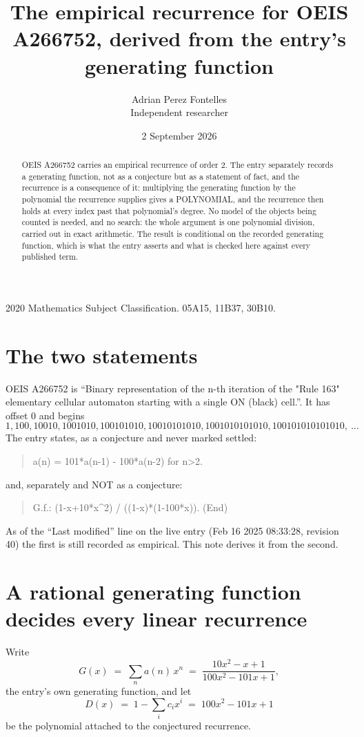 \documentclass[11pt,a4paper]{article}
\title{The empirical recurrence for OEIS A266752, derived from the entry's generating function}
\author{Adrian Perez Fontelles\\ \small Independent researcher}
\date{2 September 2026}
\theoremstyle{plain}
\theoremstyle{definition}
\begin{document}
\maketitle

\begin{abstract}
OEIS A266752 carries an empirical recurrence of order $2$. The entry separately records a
generating function, not as a conjecture but as a statement of fact, and the recurrence is a
consequence of it: multiplying the generating function by the polynomial the recurrence
supplies gives a POLYNOMIAL, and the recurrence then holds at every index past that
polynomial's degree. No model of the objects being counted is needed, and no search: the
whole argument is one polynomial division, carried out in exact arithmetic. The result is
conditional on the recorded generating function, which is what the entry asserts and what is
checked here against every published term.
\end{abstract}

\noindent\small 2020 Mathematics Subject Classification. 05A15, 11B37, 30B10.\normalsize

\section{The two statements}

OEIS A266752 is ``Binary representation of the n-th iteration of the "Rule 163" elementary cellular automaton starting with a single ON (black) cell.''. It has offset $0$ and begins
\[
1, 100, 10010, 1001010, 100101010, 10010101010, 1001010101010, 100101010101010,\ \dots
\]
The entry states, as a conjecture and never marked settled:
\begin{quote}
a(n) = 101*a(n-1) - 100*a(n-2) for n>2.
\end{quote}
and, separately and NOT as a conjecture:
\begin{quote}
G.f.: (1-x+10*x\^{}2) / ((1-x)*(1-100*x)). (End)
\end{quote}
As of the ``Last modified'' line on the live entry (Feb 16 2025 08:33:28, revision 40) the first is still
recorded as empirical. This note derives it from the second.

\section{A rational generating function decides every linear recurrence}

Write
\[
G(x)\;=\;\sum_{n}a(n)\,x^{n}\;=\;\frac{10 x^{2} - x + 1}{100 x^{2} - 101 x + 1},
\]
the entry's own generating function, and let
\[
D(x)\;=\;1-\sum_i c_i x^{i}\;=\;100 x^{2} - 101 x + 1
\]
be the polynomial attached to the conjectured recurrence.
\end{document}
